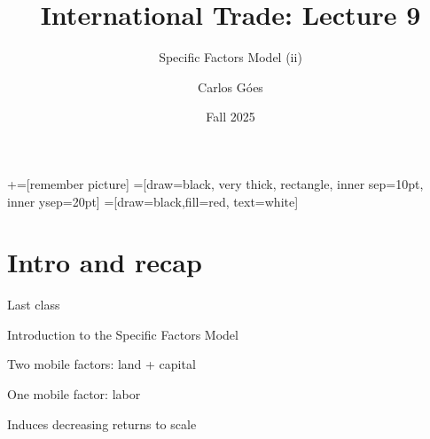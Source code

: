 \documentclass[notes,11pt, aspectratio=169, xcolor=table]{beamer}
\title[]{International Trade: Lecture 9}
\subtitle[]{Specific Factors Model (ii)}
\author[Góes]
{Carlos Góes\inst{1}}
\date{Fall 2025}
\institute[GWU]{\inst{1} George Washington University }
\newenvironment{wideitemize}{\itemize\addtolength{\itemsep}{10pt}}{\enditemize}
\begin{document}
\newcommand\marktopleft[1]{%
    \tikz[overlay,remember picture] 
        \node (marker-#1-a) at (-.3em,.3em) {};%
}
\newcommand\markbottomright[2]{%
    \tikz[overlay,remember picture] 
        \node (marker-#1-b) at (0em,0em) {};%
}
+=[remember picture] 
 =[draw=black, very thick, rectangle, inner sep=10pt, inner ysep=20pt]
 =[draw=black,fill=red, text=white]















\frame{\titlepage}
\addtocounter{framenumber}{-1}




\section{Intro and recap}

\begin{frame}{Last class}
\begin{wideitemize}
    \item Introduction to the Specific Factors Model
    \item Two mobile factors: land + capital
    \item One mobile factor: labor
    \item Induces decreasing returns to scale
\end{wideitemize}
\end{frame}
\end{document}
